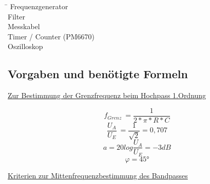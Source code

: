 \documentclass[footsepline,11pt,oneside,a4paper]{scrartcl}
\begin{document}
\begin{tabbing}

\hspace{30}\=\kill
\textbullet \> Frequenzgenerator \\
\textbullet \> Filter \\
\textbullet \> Messkabel \\
\textbullet \> Timer / Counter (PM6670) \\
\textbullet \> Oszilloskop \\

\end{tabbing}

\newpage

\par
\subsection{Vorgaben und benötigte Formeln}
\newline
\begin{center}
\large\underline{Zur Bestimmung der Grenzfrequenz beim Hochpass 1.Ordnung}
\end{center}
\newline
\newline
\newline
\newline

\begin{displaymath}
f_{Grenz}\ = \frac{1}{2* \pi * R * C}
\end{displaymath}
\newline
\newline
\begin{displaymath}
\frac{U_{A}}{U_{E}}\  = \frac{1}{ \sqrt{2} } = 0,707
\end{displaymath}
\newline
\newline
\begin{displaymath}
a  = 20 log \frac {U_{A} }{ U_{E} } = -3dB 
\end{displaymath}
\newline
\begin{displaymath}
\varphi = 45°
\end{displaymath}
\newline
\newline
\newline
\newline
\begin{center}
\large\underline{Kriterien zur Mittenfrequenzbestimmung des Bandpasses}
\end{center}
\newline
\newline
\newline
\newline
\end{document}
